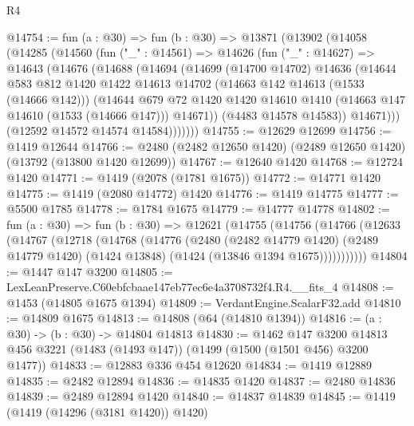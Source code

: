 \begin{lexlean}{R4}
\begin{coremodule}
@14754 := fun (a : @30) =>
  fun (b : @30) =>
  @13871
    (@13902
      (@14058
        (@14285
          (@14560
            (fun ("_" : @14561) =>
            @14626
              (fun ("_" : @14627) =>
              @14643
                (@14676
                  (@14688
                    (@14694
                      (@14699
                        (@14700 @14702)
                        @14636
                        (@14644
                          @583
                          @812
                          @1420
                          @1422
                          @14613
                          @14702
                          (@14663 @142 @14613 (@1533 (@14666 @142)))
                          (@14644
                            @679
                            @72
                            @1420
                            @1420
                            @14610
                            @1410
                            (@14663 @147 @14610 (@1533 (@14666 @147)))
                            @14671))
                        (@4483 @14578 @14583))
                      @14671)))
                (@12592 @14572 @14574 @14584)))))))
@14755 := @12629 @12699
@14756 := @1419 @12644
@14766 := @2480 (@2482 @12650 @1420) (@2489 @12650 @1420) (@13792 (@13800 @1420 @12699))
@14767 := @12640 @1420
@14768 := @12724 @1420
@14771 := @1419 (@2078 (@1781 @1675))
@14772 := @14771 @1420
@14775 := @1419 (@2080 @14772) @1420
@14776 := @1419 @14775
@14777 := @5500 @1785
@14778 := @1784 @1675
@14779 := @14777 @14778
@14802 := fun (a : @30) =>
  fun (b : @30) =>
  @12621
    (@14755
      (@14756
        (@14766
          (@12633
            (@14767
              (@12718
                (@14768
                  (@14776
                    (@2480
                      (@2482 @14779 @1420)
                      (@2489 @14779 @1420)
                      (@1424 @13848)
                      (@1424 (@13846 @1394 @1675)))))))))))
@14804 := @1447 @147 @3200
@14805 := LexLeanPreserve.C60ebfcbaae147eb77ec6e4a3708732f4.R4.__fits_4
@14808 := @1453 (@14805 @1675 @1394)
@14809 := VerdantEngine.ScalarF32.add
@14810 := @14809 @1675
@14813 := @14808 (@64 (@14810 @1394))
@14816 := (a : @30) -> (b : @30) -> @14804 @14813
@14830 := @1462
    @147
    @3200
    @14813
    @456
    @3221
    (@1483 (@1493 @147))
    (@1499 (@1500 (@1501 @456) @3200 @1477))
@14833 := @12883 @336 @454 @12620
@14834 := @1419 @12889
@14835 := @2482 @12894
@14836 := @14835 @1420
@14837 := @2480 @14836
@14839 := @2489 @12894 @1420
@14840 := @14837 @14839
@14845 := @1419 (@1419 (@14296 (@3181 @1420)) @1420)

\end{coremodule}
\end{lexlean}
